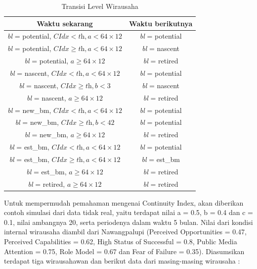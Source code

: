 \begin{table}[H]
\centering
\caption{Transisi Level Wirausaha}
\begin{tabular}{|c|c|}
\hline
Waktu sekarang & Waktu berikutnya \\
\hline
\textit{bl} = potential, $ \textit{CIdx} < \textit{th}, \textit{a} < 64 \times 12$ & \textit{bl} = potential \\
\hline
\textit{bl} = potential, $\textit{CIdx} \geq \textit{th}, \textit{a} < 64 \times 12$ & \textit{bl} = nascent \\
\hline
\textit{bl} = potential, $\textit{a} \geq 64 \times 12$ & \textit{bl} = retired \\
\hline
\textit{bl} = nascent, $\textit{CIdx} < \textit{th}, \textit{a} <64 \times 12$ & \textit{bl} = potential \\
\hline
\textit{bl} = nascent, $\textit{CIdx} \geq \textit{th}, \textit{b} < 3$ & \textit{bl} = nascent \\
\hline
\textit{bl} = nascent, $\textit{a} \geq 64 \times 12$ & \textit{bl} = retired \\
\hline
\textit{bl} = new\_bm, $\textit{CIdx} < \textit{th}, \textit{a} < 64 \times 12$ & \textit{bl} = potential \\
\hline
\textit{bl} = new\_bm, $\textit{CIdx} \geq \textit{th}, \textit{b} < 42$ & \textit{bl} = potential \\
\hline
\textit{bl} = new\_bm, $\textit{a} \geq 64 \times 12$ & \textit{bl} = retired \\
\hline
\textit{bl} = est\_bm, $\textit{CIdx} < \textit{th}, \textit{a} < 64 \times 12$ & \textit{bl} = potential \\
\hline
\textit{bl} = est\_bm, $\textit{CIdx} \geq \textit{th}, \textit{a} < 64 \times 12$ & \textit{bl} = est\_bm \\
\hline
\textit{bl} = est\_bm, $\textit{a} \geq 64 \times 12$ & \textit{bl} = retired \\
\hline
\textit{bl} = retired, $\textit{a} \geq 64 \times 12$ & \textit{bl} = retired \\
\hline
\end{tabular}
\label{tabelLW}
\end{table}


Untuk mempermudah pemahaman mengenai Continuity Index, akan diberikan contoh simulasi dari data tidak real, yaitu terdapat nilai a = 0.5, b = 0.4 dan c = 0.1, nilai ambangnya 20, serta periodenya dalam waktu 5 bulan. Nilai dari kondisi internal wirausaha diambil dari Nawangpalupi (Perceived Opportunities = 0.47, Perceived Capabilities = 0.62, High Status of Successful = 0.8, Public Media Attention = 0.75, Role Model = 0.67 dan Fear of Failure = 0.35). Diasumsikan terdapat tiga wirausahawan dan berikut data dari masing-masing wirausaha :
				
